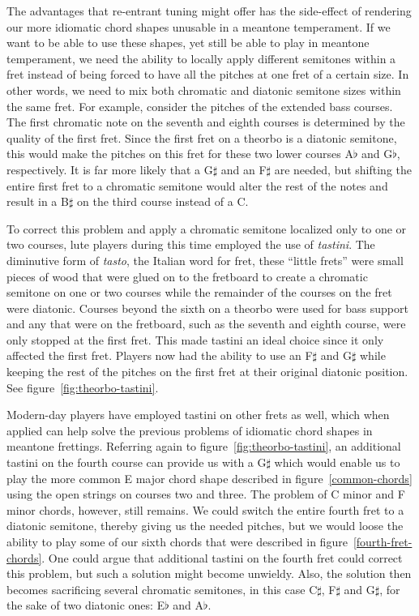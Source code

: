 The advantages that re-entrant tuning might offer has the side-effect of rendering our
more idiomatic chord shapes unusable in a meantone temperament.  If we want to be able to
use these shapes, yet still be able to play in meantone temperament, we need the ability
to locally apply different semitones within a fret instead of being forced to have all the
pitches at one fret of a certain size. In other words, we need to mix both chromatic and
diatonic semitone sizes within the same fret.  For example, consider the pitches of the
extended bass courses. The first chromatic note on the seventh and eighth courses is
determined by the quality of the first fret.  Since the first fret on a theorbo is a
diatonic semitone, this would make the pitches on this fret for these two lower courses
A$\flat$ and G$\flat$, respectively.  It is far more likely that a G$\sharp$ and an
F$\sharp$ are needed, but shifting the entire first fret to a chromatic semitone would
alter the rest of the notes and result in a B$\sharp$ on the third course instead of a C.

To correct this problem and apply a chromatic semitone localized only to one or two
courses, lute players during this time employed the use of \textit{tastini}.  The
diminutive form of \textit{tasto}, the Italian word for fret, these ``little frets'' were
small pieces of wood that were glued on to the fretboard to create a chromatic semitone on
one or two courses while the remainder of the courses on the fret were diatonic.  Courses
beyond the sixth on a theorbo were used for bass support and any that were on the
fretboard, such as the seventh and eighth course, were only stopped at the first fret.
This made tastini an ideal choice since it only affected the first fret. Players now had
the ability to use an F$\sharp$ and G$\sharp$ while keeping the rest of the pitches on the
first fret at their original diatonic position. See figure~\ref{fig:theorbo-tastini}.



Modern-day players have employed tastini on other frets as well, which when applied
can help solve the previous problems of idiomatic chord shapes in meantone frettings.
Referring again to figure~\ref{fig:theorbo-tastini}, an additional tastini on the
fourth course can provide us with a G$\sharp$ which would enable us to play the more
common E major chord shape described in figure~\ref{common-chords} using the open
strings on courses two and three.  The problem of C minor and F minor chords, however,
still remains.  We could switch the entire fourth fret to a diatonic semitone, thereby giving
us the needed pitches, but we would loose the ability to play some of our
sixth chords that were described in figure~\ref{fourth-fret-chords}.  One could argue
that additional tastini on the fourth fret could correct this problem, but such a solution
might become unwieldy.  Also, the solution then becomes sacrificing several chromatic
semitones, in this case C$\sharp$, F$\sharp$ and G$\sharp$, for the sake of two diatonic
ones: E$\flat$ and A$\flat$.

